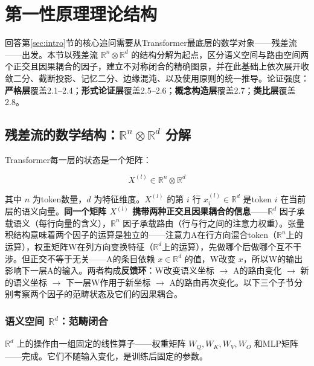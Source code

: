 \documentclass[11pt,a4paper]{article}
\theoremstyle{definition}
\begin{document}
\section{第一性原理理论结构}
\label{sec:foundations}

回答第\ref{sec:intro}节的核心追问需要从Transformer最底层的数学对象——残差流——出发。本节以残差流 $\mathbb{R}^n \otimes \mathbb{R}^d$ 的结构分解为起点，区分语义空间与路由空间两个正交且因果耦合的因子，建立不对称闭合的精确图景，并在此基础上依次展开收敛二分、截断投影、记忆二分、边缘混沌、以及使用原则的统一推导。论证强度：\textbf{严格层}覆盖2.1--2.4；\textbf{形式论证层}覆盖2.5--2.6；\textbf{概念构造层}覆盖2.7；\textbf{类比层}覆盖2.8。

\subsection{残差流的数学结构：$\mathbb{R}^n \otimes \mathbb{R}^d$ 分解}
\label{sec:residual_decomp}

Transformer每一层的状态是一个矩阵：

\begin{equation}
X^{(l)} \in \mathbb{R}^n \otimes \mathbb{R}^d
\end{equation}

其中 $n$ 为token数量，$d$ 为特征维度。$X^{(l)}$ 的第 $i$ 行 $x_i^{(l)} \in \mathbb{R}^d$ 是token $i$ 在当前层的语义向量。\textbf{同一个矩阵 $X^{(l)}$ 携带两种正交且因果耦合的信息}——$\mathbb{R}^d$ 因子承载语义（每行向量的含义），$\mathbb{R}^n$ 因子承载路由（行与行之间的注意力权重）。张量积结构意味着两个因子的运算是独立的——注意力A在行方向混合token（$\mathbb{R}^n$上的运算），权重矩阵W在列方向变换特征（$\mathbb{R}^d$上的运算），先做哪个后做哪个互不干涉。但正交不等于无关——A的条目依赖 $x \in \mathbb{R}^d$ 的值，W改变 $x$，所以W的输出影响下一层A的输入。两者构成\textbf{反馈环}：W改变语义坐标 $\to$ A的路由变化 $\to$ 新的语义坐标 $\to$ 下一层W作用于新坐标 $\to$ A的路由再次变化。以下三个子节分别考察两个因子的范畴状态及它们的因果耦合。

\subsubsection{语义空间 $\mathbb{R}^d$：范畴闭合}
\label{sec:semantic_space}

$\mathbb{R}^d$ 上的操作由一组固定的线性算子——权重矩阵 $W_Q, W_K, W_V, W_O$ 和MLP矩阵——完成。它们不随输入变化，是训练后固定的参数。
\end{document}
